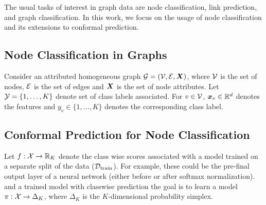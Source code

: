The usual tasks of interest in graph data are node classification, link prediction, and graph classification. 
In this work, we focus on the usage of node classification and its extensions to conformal prediction.
\subsection{Node Classification in Graphs}
Consider an attributed homogeneous graph ${\mathcal{G}} = ({\mathcal{V}}, {\mathcal{E}}, {\bm{X}})$, where ${\mathcal{V}}$ is the set of nodes, ${\mathcal{E}}$ is the set of edges and ${\bm{X}}$ is the set of node attributes.
Let ${\mathcal{Y}} = \{1, \dots, K\}$ denote set of class labels associated.
For $v \in {\mathcal{V}}$, ${\bm{x}}_v \in \mathbb{R}^d$ denotes the features and $y_v \in \{1, \dots, K\}$ denotes the corresponding class label.

\subsection{Conformal Prediction for Node Classification}
Let $f: {\mathcal{X}} \to \mathbb{R}_K$ denote the class wise scores associated with a  model trained on a separate split of the data (${\mathcal{D}}_{\text{train}}$).
For example, these could be the pre-final output layer of a neural network (either before or after softmax normalization).
and a trained model with classwise prediction the goal is to learn a model $\pi: {\mathcal{X}} \to \Delta_K$, where $\Delta_K$ is the $K$-dimensional probability simplex.
